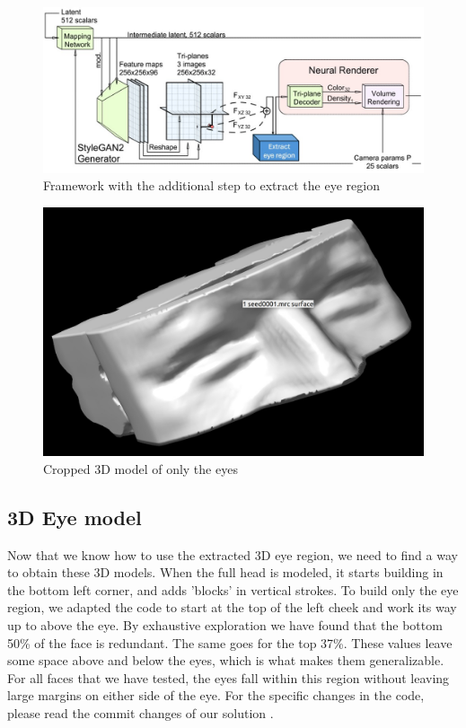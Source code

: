 \begin{figure}[H]
\centering
  \centering
  \includegraphics[width=.6\linewidth]{eye_rendering_step.jpg}
  \caption{Framework with the additional step to extract the eye region}
  \label{fig:eye_rendering_step}
\end{figure}

\begin{figure}[H]
\centering
  \centering
  \includegraphics[width=0.7\linewidth]{Cropped eyes.jpg}
  \caption{Cropped 3D model of only the eyes}
  \label{fig:cropped_eyes}
\end{figure}

\subsection{3D Eye model}
Now that we know how to use the extracted 3D eye region, we need to find a way to obtain these 3D models. When the full head is modeled, it starts building in the bottom left corner, and adds 'blocks' in vertical strokes. To build only the eye region, we adapted the code to start at the top of the left cheek and work its way up to above the eye. By exhaustive exploration we have found that the bottom 50\% of the face is redundant. The same goes for the top 37\%. These values leave some space above and below the eyes, which is what makes them generalizable. For all faces that we have tested, the eyes fall within this region without leaving large margins on either side of the eye. For the specific changes in the code, please read the commit changes of our solution \parencite{gitcommit}.